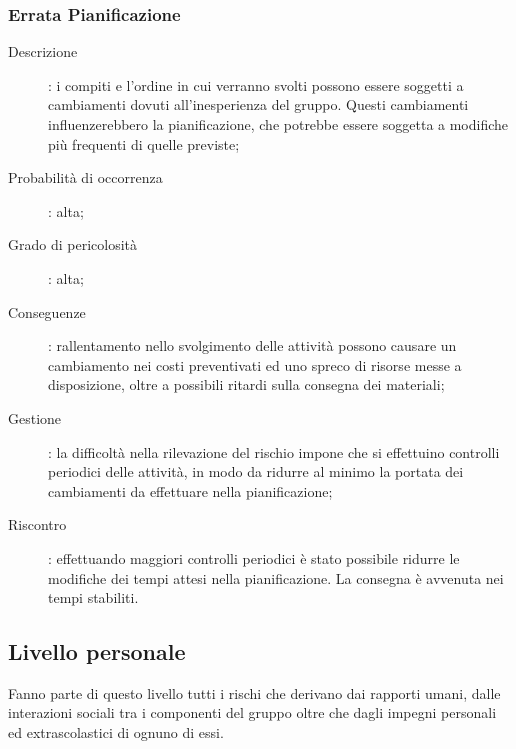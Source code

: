\documentclass[../PianoDiProgetto.tex]{subfiles}
\begin{document}
		\subsubsection{Errata Pianificazione}
		\begin{description} 
			\item [Descrizione]: i compiti e l'ordine in cui verranno svolti possono essere soggetti a cambiamenti dovuti all'inesperienza del gruppo. Questi cambiamenti influenzerebbero la pianificazione, che potrebbe essere soggetta a modifiche più frequenti di quelle previste;
			\item [Probabilità di occorrenza]: alta;
			\item [Grado di pericolosità]: alta;
			\item [Conseguenze]: rallentamento nello svolgimento delle attività possono causare un cambiamento nei costi preventivati ed uno spreco di risorse messe a disposizione, oltre a possibili ritardi sulla consegna dei materiali;
			\item [Gestione]: la difficoltà nella rilevazione del rischio impone che si effettuino controlli periodici delle attività, in modo da ridurre al minimo la portata dei cambiamenti da effettuare nella pianificazione;
			\item [Riscontro]: effettuando maggiori controlli periodici è stato possibile ridurre le modifiche dei tempi attesi nella pianificazione. La consegna è avvenuta nei tempi stabiliti.
		\end{description}
		
	\subsection{Livello personale}	
	Fanno parte di questo livello tutti i rischi che derivano dai rapporti umani, dalle interazioni sociali tra i componenti del gruppo oltre che dagli impegni personali ed extrascolastici di ognuno di essi.
\end{document}
